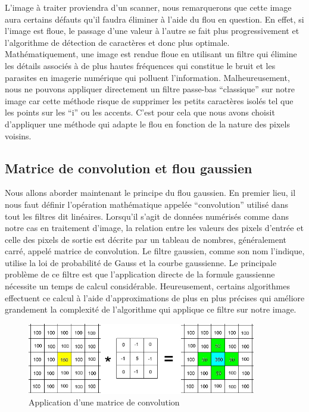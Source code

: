 \documentclass[11pt]{report}
\begin{document}
L'image à traiter proviendra d'un scanner, nous remarquerons que cette image aura certains défauts qu'il faudra éliminer à l'aide du flou en question. En effet, si l'image est floue, le passage d'une valeur à l'autre se fait plus progressivement et l'algorithme de détection de caractères et donc plus optimale. Mathématiquement, une image est rendue floue en utilisant un filtre qui élimine les détails associés à de plus hautes fréquences qui constitue le bruit et les parasites en imagerie numérique qui polluent l'information. Malheureusement, nous ne pouvons appliquer directement un filtre passe-bas ``classique'' sur notre image car cette méthode risque de supprimer les petits caractères isolés tel que les points sur les ``i'' ou les accents. C'est pour cela que nous avons choisit d'appliquer une méthode qui adapte le flou en fonction de la nature des pixels voisins.

\subsection{Matrice de convolution et flou gaussien}

Nous allons aborder maintenant le principe du flou gaussien. En premier lieu, il nous faut définir l'opération mathématique appelée ``convolution'' utilisé dans tout les filtres dit linéaires. Lorsqu'il s'agit de données numérisés comme dans notre cas en traitement d'image, la relation entre les valeurs des pixels d'entrée et celle des pixels de sortie est décrite par un tableau de nombres, généralement carré, appelé matrice de convolution.  Le filtre gaussien, comme son nom l'indique, utilise la loi de probabilité de Gauss et la courbe gaussienne. Le principale problème de ce filtre est que l'application directe de la formule gaussienne nécessite un temps de calcul considérable. Heureusement, certains algorithmes effectuent ce calcul à l'aide d'approximations de plus en plus précises qui améliore grandement la complexité de l'algorithme qui applique ce filtre sur notre image.

\begin{figure}[htbp]
\centering
\includegraphics[width=10cm]{matconvol.jpg}
\caption{Application d'une matrice de convolution}
\end{figure}
\end{document}
